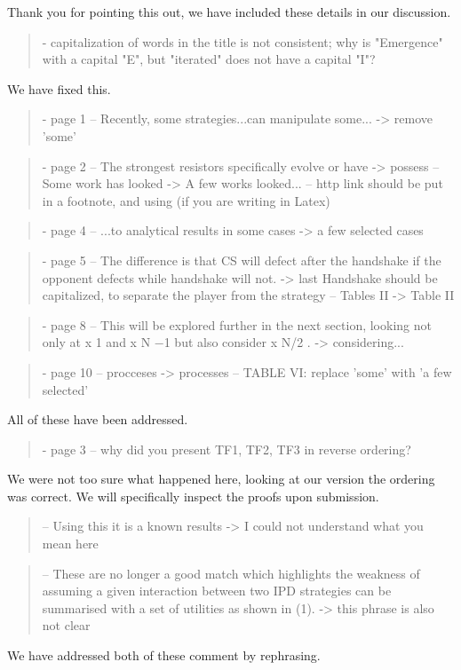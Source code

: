 \documentclass[a4]{article}
\begin{document}
Thank you for pointing this out, we have included these details in our
discussion.

\begin{quote}
- capitalization of words in the title is not consistent; why is "Emergence" with a capital "E", but "iterated" does not have a capital "I"?
\end{quote}

We have fixed this.

\begin{quote}
- page 1
	-- Recently, some strategies...can manipulate some... -> remove 'some'
\end{quote}

\begin{quote}
- page 2
	-- The strongest resistors specifically evolve or have -> possess
	-- Some work has looked -> A few works looked...
	-- http link should be put in a footnote, and using \url{} (if you are writing in Latex)
\end{quote}

\begin{quote}
- page 4
	-- ...to analytical results in some cases -> a few selected cases
\end{quote}

\begin{quote}
- page 5
	-- The difference is that CS will
defect after the handshake if the opponent defects while
handshake will not. -> last Handshake should be capitalized, to separate the player from the strategy
	-- Tables II -> Table II
\end{quote}

\begin{quote}
- page 8
	--  This will be explored
further in the next section, looking not only at x 1 and x N −1
but also consider x N/2 . -> considering...
\end{quote}

\begin{quote}
- page 10
	-- procceses -> processes
	-- TABLE VI: replace 'some' with 'a few selected'
\end{quote}

All of these have been addressed. 

\begin{quote}
- page 3
	-- why did you present TF1, TF2, TF3 in reverse ordering?
\end{quote}

We were not too sure what happened here, looking at our version the ordering was
correct. We will specifically inspect the proofs upon submission.

\begin{quote}
	-- Using this it is a known results -> I could not understand what you mean here
\end{quote}

\begin{quote}
	-- These
are no longer a good match which highlights the weakness of
assuming a given interaction between two IPD strategies can be
summarised with a set of utilities as shown in (1). -> this phrase is also not clear
\end{quote}

We have addressed both of these comment by rephrasing.
\end{document}
